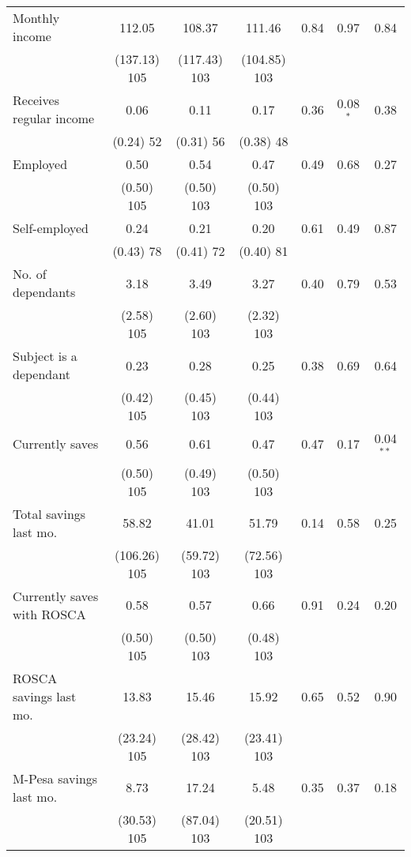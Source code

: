\begin{table}[htbp]
{\begin{threeparttable}
\begin{tabular}{l*{6}{c}}
Monthly income&   112.05&   108.37&   111.46&     0.84&     0.97&     0.84\\
          &(137.13) 105&(117.43) 103&(104.85) 103&         &         &         \\
Receives regular income&     0.06&     0.11&     0.17&     0.36&0.08$^{*}$&     0.38\\
          &(0.24) 52&(0.31) 56&(0.38) 48&         &         &         \\
Employed  &     0.50&     0.54&     0.47&     0.49&     0.68&     0.27\\
          &(0.50) 105&(0.50) 103&(0.50) 103&         &         &         \\
Self-employed&     0.24&     0.21&     0.20&     0.61&     0.49&     0.87\\
          &(0.43) 78&(0.41) 72&(0.40) 81&         &         &         \\
No. of dependants&     3.18&     3.49&     3.27&     0.40&     0.79&     0.53\\
          &(2.58) 105&(2.60) 103&(2.32) 103&         &         &         \\
Subject is a dependant&     0.23&     0.28&     0.25&     0.38&     0.69&     0.64\\
          &(0.42) 105&(0.45) 103&(0.44) 103&         &         &         \\
Currently saves&     0.56&     0.61&     0.47&     0.47&     0.17&0.04$^{**}$\\
          &(0.50) 105&(0.49) 103&(0.50) 103&         &         &         \\
Total savings last mo.&    58.82&    41.01&    51.79&     0.14&     0.58&     0.25\\
          &(106.26) 105&(59.72) 103&(72.56) 103&         &         &         \\
Currently saves with ROSCA&     0.58&     0.57&     0.66&     0.91&     0.24&     0.20\\
          &(0.50) 105&(0.50) 103&(0.48) 103&         &         &         \\
ROSCA savings last mo.&    13.83&    15.46&    15.92&     0.65&     0.52&     0.90\\
          &(23.24) 105&(28.42) 103&(23.41) 103&         &         &         \\
M-Pesa savings last mo.&     8.73&    17.24&     5.48&     0.35&     0.37&     0.18\\
          &(30.53) 105&(87.04) 103&(20.51) 103&         &         &         \\

\end{tabular}
\end{threeparttable}}
\end{table}
